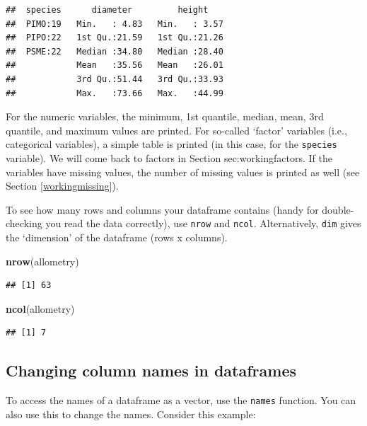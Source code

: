 \documentclass[]{book}
\newenvironment{Shaded}{\begin{snugshade}}{\end{snugshade}}
\newcommand{\KeywordTok}[1]{\textcolor[rgb]{0.13,0.29,0.53}{\textbf{#1}}}
\newcommand{\NormalTok}[1]{#1}
\begin{document}
\begin{verbatim}
##  species      diameter         height     
##  PIMO:19   Min.   : 4.83   Min.   : 3.57  
##  PIPO:22   1st Qu.:21.59   1st Qu.:21.26  
##  PSME:22   Median :34.80   Median :28.40  
##            Mean   :35.56   Mean   :26.01  
##            3rd Qu.:51.44   3rd Qu.:33.93  
##            Max.   :73.66   Max.   :44.99
\end{verbatim}

For the numeric variables, the minimum, 1st quantile, median, mean, 3rd quantile, and maximum values are printed. For so-called `factor' variables (i.e., categorical variables), a simple table is printed (in this case, for the \texttt{species} variable). We will come back to factors in Section sec:workingfactors. If the variables have missing values, the number of missing values is printed as well (see Section \ref{workingmissing}).

To see how many rows and columns your dataframe contains (handy for double-checking you read the data correctly), use \texttt{nrow} and \texttt{ncol}. Alternatively, \texttt{dim} gives the `dimension' of the dataframe (rows x columns).

\begin{Shaded}
\begin{Highlighting}[]
\KeywordTok{nrow}\NormalTok{(allometry)}
\end{Highlighting}
\end{Shaded}

\begin{verbatim}
## [1] 63
\end{verbatim}

\begin{Shaded}
\begin{Highlighting}[]
\KeywordTok{ncol}\NormalTok{(allometry)}
\end{Highlighting}
\end{Shaded}

\begin{verbatim}
## [1] 7
\end{verbatim}

\hypertarget{namesdataframe}{%
\subsection{Changing column names in dataframes}\label{namesdataframe}}

To access the names of a dataframe as a vector, use the \texttt{names} function. You can also use this to change the names. Consider this example:
\end{document}
